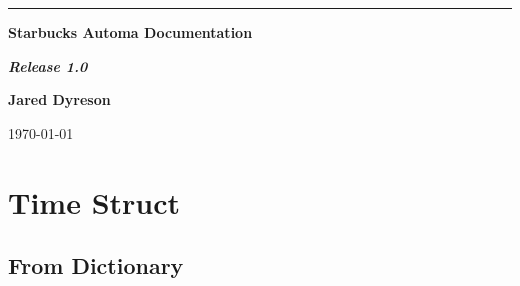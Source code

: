 \documentclass{article}
\newcommand{\HL}{\par\noindent\rule{\textwidth}{0.4pt}}
\begin{document}
\HL
\begin{flushright}
\textbf{Starbucks Automa Documentation}

\textbf{\emph{Release 1.0}}

\vspace{100px}

\textbf{Jared Dyreson}


\vspace{150px}

\today

\end{flushright}

\newpage

\tableofcontents

\newpage

\section{Time Struct}

\subsection{From Dictionary}
\end{document}
